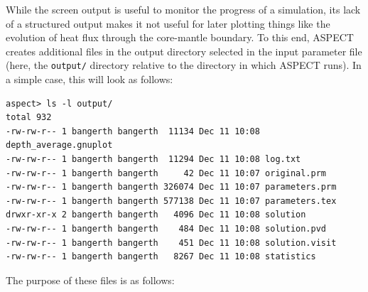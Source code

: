 \documentclass{article}
\newcommand{\aspect}{\textsc{ASPECT}}
\begin{document}
While the screen output is useful to monitor the progress of a simulation,
its lack of a structured output makes it not useful for later plotting things
like the evolution of heat flux through the core-mantle boundary. To this end,
\aspect{} creates additional files in the output directory selected in the
input parameter file
(here, the \texttt{output/} directory relative to the
directory in which \aspect{} runs). In a simple case, this will look as
follows:
\begin{lstlisting}[frame=single,language=ksh]
aspect> ls -l output/
total 932
-rw-rw-r-- 1 bangerth bangerth  11134 Dec 11 10:08 depth_average.gnuplot
-rw-rw-r-- 1 bangerth bangerth  11294 Dec 11 10:08 log.txt
-rw-rw-r-- 1 bangerth bangerth     42 Dec 11 10:07 original.prm
-rw-rw-r-- 1 bangerth bangerth 326074 Dec 11 10:07 parameters.prm
-rw-rw-r-- 1 bangerth bangerth 577138 Dec 11 10:07 parameters.tex
drwxr-xr-x 2 bangerth bangerth   4096 Dec 11 10:08 solution
-rw-rw-r-- 1 bangerth bangerth    484 Dec 11 10:08 solution.pvd
-rw-rw-r-- 1 bangerth bangerth    451 Dec 11 10:08 solution.visit
-rw-rw-r-- 1 bangerth bangerth   8267 Dec 11 10:08 statistics
\end{lstlisting}
The purpose of these files is as follows:
\end{document}
